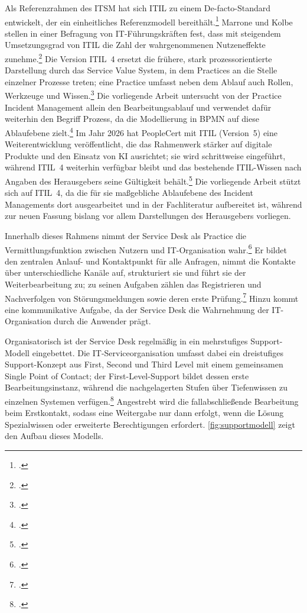 Als Referenzrahmen des ITSM hat sich ITIL zu einem De-facto-Standard entwickelt, der ein einheitliches Referenzmodell bereith\"alt.\footcite[Vgl.][S.~423]{Tiemeyer2020} Marrone und Kolbe stellen in einer Befragung von IT-F\"uhrungskr\"aften fest, dass mit steigendem Umsetzungsgrad von ITIL die Zahl der wahrgenommenen Nutzeneffekte zunehme.\footcite[Vgl.][hier S.~363]{MarroneKolbe2011} Die Version ITIL~4 ersetzt die fr\"uhere, stark prozessorientierte Darstellung durch das Service Value System, in dem Practices an die Stelle einzelner Prozesse treten; eine Practice umfasst neben dem Ablauf auch Rollen, Werkzeuge und Wissen.\footcite[Vgl.][S.~47 und 56]{Agutter2020} Die vorliegende Arbeit untersucht von der Practice Incident Management allein den Bearbeitungsablauf und verwendet daf\"ur weiterhin den Begriff Prozess, da die Modellierung in BPMN auf diese Ablaufebene zielt.\footcite[Vgl.][S.~447]{Tiemeyer2020} Im Jahr 2026 hat PeopleCert mit ITIL (Version~5) eine Weiterentwicklung ver\"offentlicht, die das Rahmenwerk st\"arker auf digitale Produkte und den Einsatz von KI ausrichtet; sie wird schrittweise eingef\"uhrt, w\"ahrend ITIL~4 weiterhin verf\"ugbar bleibt und das bestehende ITIL-Wissen nach Angaben des Herausgebers seine G\"ultigkeit beh\"alt.\footcite[Vgl.][o.~S.]{PeopleCert2026} Die vorliegende Arbeit st\"utzt sich auf ITIL~4, da die f\"ur sie ma{\ss}gebliche Ablaufebene des Incident Managements dort ausgearbeitet und in der Fachliteratur aufbereitet ist, w\"ahrend zur neuen Fassung bislang vor allem Darstellungen des Herausgebers vorliegen.

Innerhalb dieses Rahmens nimmt der Service Desk als Practice die Vermittlungsfunktion zwischen Nutzern und IT-Organisation wahr.\footcite[Vgl.][S.~69]{Agutter2020} Er bildet den zentralen Anlauf- und Kontaktpunkt f\"ur alle Anfragen, nimmt die Kontakte \"uber unterschiedliche Kan\"ale auf, strukturiert sie und f\"uhrt sie der Weiterbearbeitung zu; zu seinen Aufgaben z\"ahlen das Registrieren und Nachverfolgen von St\"orungsmeldungen sowie deren erste Pr\"ufung.\footcite[Vgl.][S.~450]{Tiemeyer2020} Hinzu kommt eine kommunikative Aufgabe, da der Service Desk die Wahrnehmung der IT-Organisation durch die Anwender pr\"agt.

Organisatorisch ist der Service Desk regelm\"a{\ss}ig in ein mehrstufiges Support-Modell eingebettet. Die IT-Serviceorganisation umfasst dabei ein dreistufiges Support-Konzept aus First, Second und Third Level mit einem gemeinsamen Single Point of Contact; der First-Level-Support bildet dessen erste Bearbeitungsinstanz, w\"ahrend die nachgelagerten Stufen \"uber Tiefenwissen zu einzelnen Systemen verf\"ugen.\footcite[Vgl.][S.~476]{Tiemeyer2020} Angestrebt wird die fallabschlie{\ss}ende Bearbeitung beim Erstkontakt, sodass eine Weitergabe nur dann erfolgt, wenn die L\"osung Spezialwissen oder erweiterte Berechtigungen erfordert. \autoref{fig:supportmodell} zeigt den Aufbau dieses Modells.

